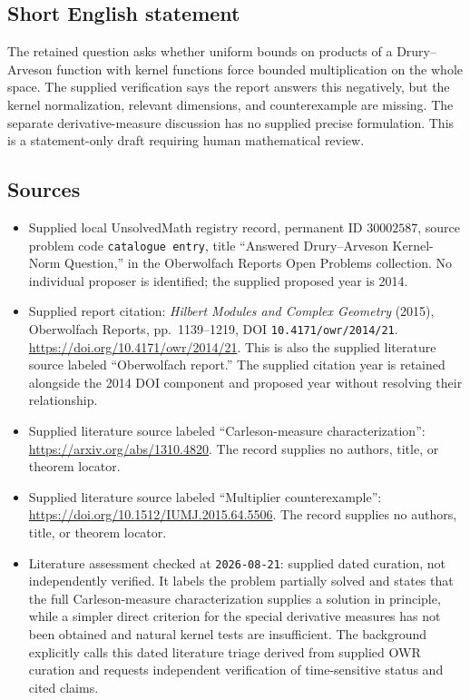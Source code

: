 \documentclass[11pt]{article}
\begin{document}
\subsection{Short English statement}
The retained question asks whether uniform bounds on products of a Drury--Arveson function with kernel functions force bounded multiplication on the whole space. The supplied verification says the report answers this negatively, but the kernel normalization, relevant dimensions, and counterexample are missing. The separate derivative-measure discussion has no supplied precise formulation. This is a statement-only draft requiring human mathematical review.
\subsection{Sources}
\begin{itemize}
\item Supplied local UnsolvedMath registry record, permanent ID \(30002587\), source problem code \texttt{catalogue entry}, title ``Answered Drury--Arveson Kernel-Norm Question,'' in the Oberwolfach Reports Open Problems collection. No individual proposer is identified; the supplied proposed year is 2014.
\item Supplied report citation: \emph{Hilbert Modules and Complex Geometry} (2015), Oberwolfach Reports, pp.~1139--1219, DOI \texttt{10.4171/owr/2014/21}. \url{https://doi.org/10.4171/owr/2014/21}. This is also the supplied literature source labeled ``Oberwolfach report.'' The supplied citation year is retained alongside the 2014 DOI component and proposed year without resolving their relationship.
\item Supplied literature source labeled ``Carleson-measure characterization'': \url{https://arxiv.org/abs/1310.4820}. The record supplies no authors, title, or theorem locator.
\item Supplied literature source labeled ``Multiplier counterexample'': \url{https://doi.org/10.1512/IUMJ.2015.64.5506}. The record supplies no authors, title, or theorem locator.
\item Literature assessment checked at \texttt{2026-08-21}: supplied dated curation, not independently verified. It labels the problem partially solved and states that the full Carleson-measure characterization supplies a solution in principle, while a simpler direct criterion for the special derivative measures has not been obtained and natural kernel tests are insufficient. The background explicitly calls this dated literature triage derived from supplied OWR curation and requests independent verification of time-sensitive status and cited claims.
\end{itemize}
\end{document}
